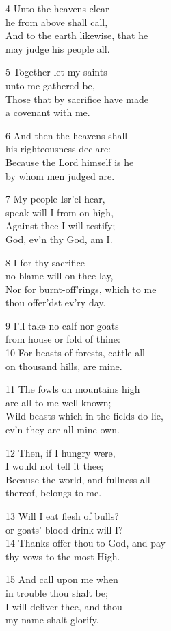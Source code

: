 \begin{multicols}{3}
4 Unto the heavens clear\\
he from above shall call,\\
And to the earth likewise, that he\\
may judge his people all.

5 Together let my saints\\
unto me gathered be,\\
Those that by sacrifice have made\\
a covenant with me.

6 And then the heavens shall\\
his righteousness declare:\\
Because the Lord himself is he\\
by whom men judged are.

7 My people Isr’el hear,\\
speak will I from on high,\\
Against thee I will testify;\\
God, ev’n thy God, am I.

8 I for thy sacrifice\\
no blame will on thee lay,\\
Nor for burnt-off’rings, which to me\\
thou offer’dst ev’ry day.

9 I’ll take no calf nor goats\\
from house or fold of thine:\\
10 For beasts of forests, cattle all\\
on thousand hills, are mine.

11 The fowls on mountains high\\
are all to me well known;\\
Wild beasts which in the fields do lie,\\
ev’n they are all mine own.

12 Then, if I hungry were,\\
I would not tell it thee;\\
Because the world, and fullness all\\
thereof, belongs to me.

13 Will I eat flesh of bulls?\\
or goats’ blood drink will I?\\
14 Thanks offer thou to God, and pay\\
thy vows to the most High.

15 And call upon me when\\
in trouble thou shalt be;\\
I will deliver thee, and thou\\
my name shalt glorify.


\end{multicols}
